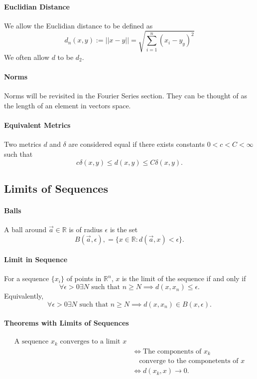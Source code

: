 \paragraph{Euclidian Distance}
We allow the Euclidian distance to be defined as
\[d_n(x,y) := ||x-y|| = \sqrt{\sum_{i=1}^{n} (x_i - y_y)^2}\]
We often allow \(d\) to be \(d_2\).

\paragraph{Norms} Norms will be revisited in the Fourier Series section. They can be thought of as the length of an element in vectors space.

\paragraph{Equivalent Metrics}
Two metrics \(d\) and \(\delta\) are considered equal if 
there exists constants \(0 < c < C < \infty\) such that
\[ c\delta (x,y) \leq d(x,y) \leq C \delta(x, y).\]

\subsection{Limits of Sequences}

\paragraph{Balls} A ball around \(\vec{a}\in \mathbb{R} \) is of radius \( \epsilon \) is the set
\[B(\vec{a}, \epsilon), = \{x\in \mathbb{R} : d(\vec{a}, x) < \epsilon\}.\]

\paragraph{Limit in Sequence} 
For a sequence \( \{x_i\} \) of points in \( \mathbb{R}^n \),
\(x\) is the limit of the sequence if and only if 
\[\forall \epsilon > 0 \exists N \text{ such that } n \geq N \implies d(x, x_n) \leq \epsilon. \]
Equivalently,
\[\forall \epsilon > 0 \exists N \text{ such that } n \geq N \implies d(x, x_n) \in B(x, \epsilon).\]

\paragraph{Theorems with Limits of Sequences}
\begin{align*}
    \text{A sequence \(x_k\) converges to a limit \(x\)}\\
    &\Leftrightarrow \text{The components of \(x_k\)} \\
    & \quad \text{converge to the componetents of \(x\)} \\
    & \Leftrightarrow d(x_k, x) \rightarrow 0.
\end{align*}

